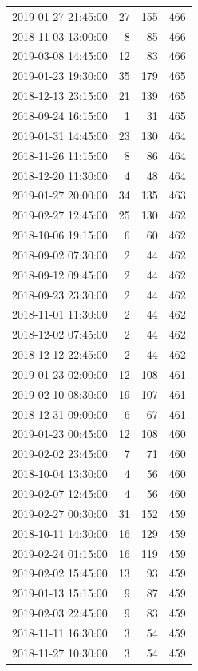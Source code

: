 \begin{tabular}{lrrr}
2019-01-27 21:45:00 & 27 & 155 & 466 \\
2018-11-03 13:00:00 & 8 & 85 & 466 \\
2019-03-08 14:45:00 & 12 & 83 & 466 \\
2019-01-23 19:30:00 & 35 & 179 & 465 \\
2018-12-13 23:15:00 & 21 & 139 & 465 \\
2018-09-24 16:15:00 & 1 & 31 & 465 \\
2019-01-31 14:45:00 & 23 & 130 & 464 \\
2018-11-26 11:15:00 & 8 & 86 & 464 \\
2018-12-20 11:30:00 & 4 & 48 & 464 \\
2019-01-27 20:00:00 & 34 & 135 & 463 \\
2019-02-27 12:45:00 & 25 & 130 & 462 \\
2018-10-06 19:15:00 & 6 & 60 & 462 \\
2018-09-02 07:30:00 & 2 & 44 & 462 \\
2018-09-12 09:45:00 & 2 & 44 & 462 \\
2018-09-23 23:30:00 & 2 & 44 & 462 \\
2018-11-01 11:30:00 & 2 & 44 & 462 \\
2018-12-02 07:45:00 & 2 & 44 & 462 \\
2018-12-12 22:45:00 & 2 & 44 & 462 \\
2019-01-23 02:00:00 & 12 & 108 & 461 \\
2019-02-10 08:30:00 & 19 & 107 & 461 \\
2018-12-31 09:00:00 & 6 & 67 & 461 \\
2019-01-23 00:45:00 & 12 & 108 & 460 \\
2019-02-02 23:45:00 & 7 & 71 & 460 \\
2018-10-04 13:30:00 & 4 & 56 & 460 \\
2019-02-07 12:45:00 & 4 & 56 & 460 \\
2019-02-27 00:30:00 & 31 & 152 & 459 \\
2018-10-11 14:30:00 & 16 & 129 & 459 \\
2019-02-24 01:15:00 & 16 & 119 & 459 \\
2019-02-02 15:45:00 & 13 & 93 & 459 \\
2019-01-13 15:15:00 & 9 & 87 & 459 \\
2019-02-03 22:45:00 & 9 & 83 & 459 \\
2018-11-11 16:30:00 & 3 & 54 & 459 \\
2018-11-27 10:30:00 & 3 & 54 & 459 \\

\end{tabular}
